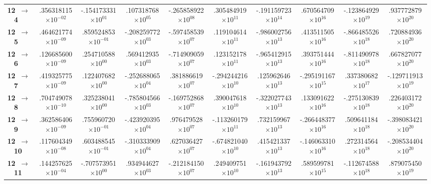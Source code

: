 \documentclass[reviewcopy]{elsarticle}
\begin{document}
\begin{landscape}
\begin{longtable}{lccccccccc}
{\bf 12~$\to$~ 4}   &   .356318115$\times10^{-02}$ & -.154173331$\times10^{ 01}$ &  .107318768$\times10^{ 05}$ & -.265858922$\times10^{ 08}$ &  .305484919$\times10^{ 11}$ & -.191159723$\times10^{ 14}$ &  .670564709$\times10^{ 16}$ & -.123864929$\times10^{ 19}$ &  .937772879$\times10^{ 20}$ \\
{\bf 12~$\to$~ 5}   &   .464621774$\times10^{-09}$ &  .859524853$\times10^{-01}$ & -.208259772$\times10^{ 03}$ & -.597458539$\times10^{ 07}$ &  .119104614$\times10^{ 11}$ & -.986002756$\times10^{ 13}$ &  .413511505$\times10^{ 16}$ & -.866485526$\times10^{ 18}$ &  .720884936$\times10^{ 20}$ \\
{\bf 12~$\to$~ 6}   &   .126685600$\times10^{-09}$ &  .254710588$\times10^{ 00}$ &  .569412935$\times10^{ 03}$ & -.714909059$\times10^{ 07}$ &  .123152178$\times10^{ 11}$ & -.965412915$\times10^{ 13}$ &  .393751444$\times10^{ 16}$ & -.811490978$\times10^{ 18}$ &  .667827077$\times10^{ 20}$ \\
{\bf 12~$\to$~ 7}   &   .419325775$\times10^{-09}$ &  .122407682$\times10^{ 00}$ & -.252688065$\times10^{ 04}$ &  .381886619$\times10^{ 07}$ & -.294244216$\times10^{ 10}$ &  .125962646$\times10^{ 13}$ & -.295191167$\times10^{ 15}$ &  .337380682$\times10^{ 17}$ & -.129711913$\times10^{ 19}$ \\
{\bf 12~$\to$~ 8}   &   .704749078$\times10^{-10}$ &  .325238041$\times10^{ 00}$ & -.785804566$\times10^{ 03}$ & -.169752868$\times10^{ 07}$ &  .390047618$\times10^{ 10}$ & -.322027743$\times10^{ 13}$ &  .133091622$\times10^{ 16}$ & -.275130839$\times10^{ 18}$ &  .226403172$\times10^{ 20}$ \\
{\bf 12~$\to$~ 9}   &   .362586406$\times10^{-09}$ &  .755960720$\times10^{-01}$ & -.423920395$\times10^{ 04}$ &  .976479528$\times10^{ 07}$ & -.113260179$\times10^{ 11}$ &  .732159967$\times10^{ 13}$ & -.266448377$\times10^{ 16}$ &  .509641184$\times10^{ 18}$ & -.398083421$\times10^{ 20}$ \\
{\bf 12~$\to$~ 10}  &   .117604349$\times10^{-08}$ &  .603488545$\times10^{-01}$ & -.310333909$\times10^{ 04}$ &  .627036427$\times10^{ 07}$ & -.674821040$\times10^{ 10}$ &  .415421337$\times10^{ 13}$ & -.146063310$\times10^{ 16}$ &  .272314564$\times10^{ 18}$ & -.208534404$\times10^{ 20}$ \\
{\bf 12~$\to$~ 11}  &   .144257625$\times10^{-04}$ & -.707573951$\times10^{ 00}$ &  .934944627$\times10^{ 03}$ & -.212184150$\times10^{ 07}$ &  .249409751$\times10^{ 10}$ & -.161943792$\times10^{ 13}$ &  .589599781$\times10^{ 15}$ & -.112674588$\times10^{ 18}$ &  .879075450$\times10^{ 19}$ \\

\end{longtable}
\end{landscape}
\end{document}
